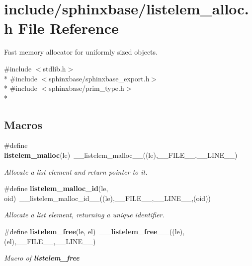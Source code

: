 \section{include/sphinxbase/listelem\-\_\-alloc.h File Reference}
\label{listelem__alloc_8h}


Fast memory allocator for uniformly sized objects.  


{\ttfamily \#include $<$stdlib.\-h$>$}\\*
{\ttfamily \#include $<$sphinxbase/sphinxbase\-\_\-export.\-h$>$}\\*
{\ttfamily \#include $<$sphinxbase/prim\-\_\-type.\-h$>$}\\*
\subsection*{Macros}
\begin{DoxyCompactItemize}
\item 
\#define {\bf listelem\-\_\-malloc}(le)~\-\_\-\-\_\-listelem\-\_\-malloc\-\_\-\-\_\-((le),\-\_\-\-\_\-\-F\-I\-L\-E\-\_\-\-\_\-,\-\_\-\-\_\-\-L\-I\-N\-E\-\_\-\-\_\-)\label{listelem__alloc_8h_ad0c40e65d9cca0d7ec08fcf416b09af2}

\begin{DoxyCompactList}\small\item\em Allocate a list element and return pointer to it. \end{DoxyCompactList}\item 
\#define {\bf listelem\-\_\-malloc\-\_\-id}(le, oid)~\-\_\-\-\_\-listelem\-\_\-malloc\-\_\-id\-\_\-\-\_\-((le),\-\_\-\-\_\-\-F\-I\-L\-E\-\_\-\-\_\-,\-\_\-\-\_\-\-L\-I\-N\-E\-\_\-\-\_\-,(oid))\label{listelem__alloc_8h_aa9bbb7161aceacdba49b41b189554507}

\begin{DoxyCompactList}\small\item\em Allocate a list element, returning a unique identifier. \end{DoxyCompactList}\item 
\#define {\bf listelem\-\_\-free}(le, el)~{\bf \-\_\-\-\_\-listelem\-\_\-free\-\_\-\-\_\-}((le),(el),\-\_\-\-\_\-\-F\-I\-L\-E\-\_\-\-\_\-,\-\_\-\-\_\-\-L\-I\-N\-E\-\_\-\-\_\-)\label{listelem__alloc_8h_a67de661d7ca552347fa6f03005e25d74}

\begin{DoxyCompactList}\small\item\em Macro of {\bfseries listelem\-\_\-free} \end{DoxyCompactList}\end{DoxyCompactItemize}
